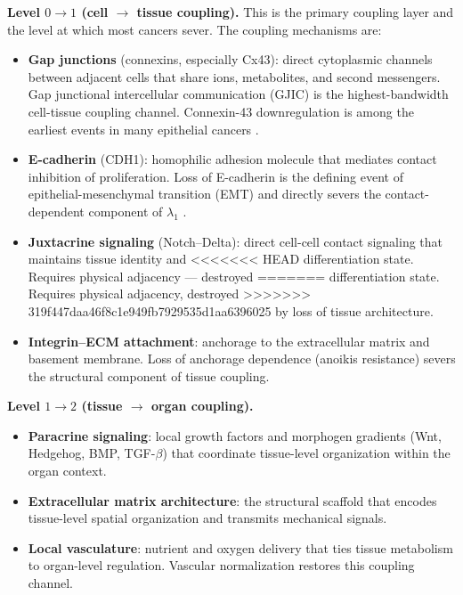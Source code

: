 \documentclass[11pt]{article}
\theoremstyle{definition}
\theoremstyle{remark}
\begin{document}
\textbf{Level $0 \to 1$ (cell $\to$ tissue coupling).}
This is the primary coupling layer and the level at which most
cancers sever. The coupling mechanisms are:
\begin{itemize}
\item \textbf{Gap junctions} (connexins, especially Cx43): direct
   cytoplasmic channels between adjacent cells that share ions,
   metabolites, and second messengers. Gap junctional intercellular
   communication (GJIC) is the highest-bandwidth cell-tissue coupling
   channel. Connexin-43 downregulation is among the earliest events
   in many epithelial cancers \cite{Aasen2016}.
\item \textbf{E-cadherin} (CDH1): homophilic adhesion molecule that
   mediates contact inhibition of proliferation. Loss of E-cadherin
   is the defining event of epithelial-mesenchymal transition (EMT)
   and directly severs the contact-dependent component of $\lambda_1$
   \cite{Hanahan2011}.
\item \textbf{Juxtacrine signaling} (Notch--Delta): direct
   cell-cell contact signaling that maintains tissue identity and
<<<<<<< HEAD
   differentiation state. Requires physical adjacency --- destroyed
=======
   differentiation state. Requires physical adjacency, destroyed
>>>>>>> 319f447daa46f8c1e949fb7929535d1aa6396025
   by loss of tissue architecture.
\item \textbf{Integrin--ECM attachment}: anchorage to the
   extracellular matrix and basement membrane. Loss of anchorage
   dependence (anoikis resistance) severs the structural component
   of tissue coupling.
\end{itemize}

\textbf{Level $1 \to 2$ (tissue $\to$ organ coupling).}
\begin{itemize}
\item \textbf{Paracrine signaling}: local growth factors and
   morphogen gradients (Wnt, Hedgehog, BMP, TGF-$\beta$) that
   coordinate tissue-level organization within the organ context.
\item \textbf{Extracellular matrix architecture}: the structural
   scaffold that encodes tissue-level spatial organization and
   transmits mechanical signals.
\item \textbf{Local vasculature}: nutrient and oxygen delivery
   that ties tissue metabolism to organ-level regulation. Vascular
   normalization restores this coupling channel.
\end{itemize}
\end{document}
